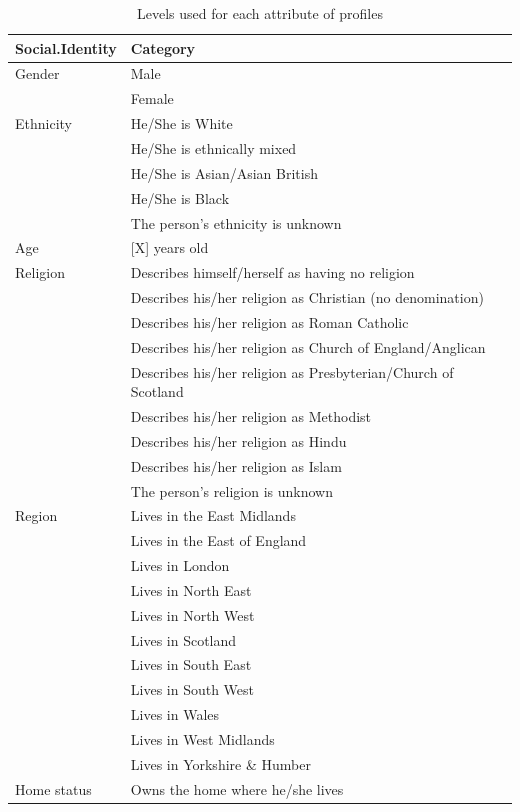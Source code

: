 \documentclass[]{cupjournal}
\begin{document}
\begin{table}

\caption{\label{tab:LevelsChunk}\label{tab:Levels}Levels used for each attribute of profiles}
\centering
\begin{tabular}[t]{ll}
\toprule
Social.Identity & Category\\
\midrule
Gender & Male\\
 & Female\\
Ethnicity & He/She is White\\
 & He/She is ethnically mixed\\
 & He/She is Asian/Asian British\\
\addlinespace
 & He/She is Black\\
 & The person's ethnicity is unknown\\
Age & {}[X] years old\\
Religion & Describes himself/herself as having no religion\\
 & Describes his/her religion as Christian (no denomination)\\
\addlinespace
 & Describes his/her religion as Roman Catholic\\
 & Describes his/her religion as Church of England/Anglican\\
 & Describes his/her religion as Presbyterian/Church of Scotland\\
 & Describes his/her religion as Methodist\\
 & Describes his/her religion as Hindu\\
\addlinespace
 & Describes his/her religion as Islam\\
 & The person's religion is unknown\\
Region & Lives in the East Midlands\\
 & Lives in the East of England\\
 & Lives in London\\
\addlinespace
 & Lives in North East\\
 & Lives in North West\\
 & Lives in Scotland\\
 & Lives in South East\\
 & Lives in South West\\
\addlinespace
 & Lives in Wales\\
 & Lives in West Midlands\\
 & Lives in Yorkshire \& Humber\\
Home status & Owns the home where he/she lives\\

\end{tabular}
\end{table}
\end{document}
